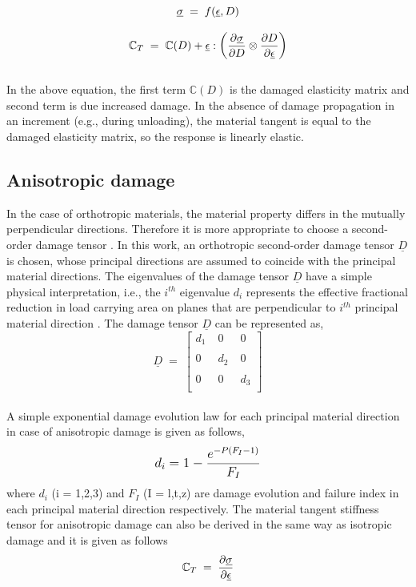 \documentclass[12pt,a4paper,twoside,openright]{report}
\begin{document}
\begin{equation*}
\large{\underline{\sigma}  \; = \; f(\underline{ \epsilon}, D) }
\end{equation*}

\begin{equation}
\large{\mathbb{C}_{T}  \; = \; \mathbb{C}(D) + \underline{ \epsilon}  : \Big(\frac{\partial \underline{\sigma} }{\partial D} \otimes \frac{\partial D}{\partial \underline{ \epsilon}} \Big)    }
\end{equation}
\\
In the above equation, the first term $\mathbb{C}(D)$ is the damaged elasticity matrix and second term is due increased damage. In the absence of damage propagation in an increment (e.g., during unloading), the material tangent is equal to the damaged elasticity matrix, so the response is linearly elastic.
\subsection{Anisotropic damage}
\indent\indent\indent In the case of orthotropic materials, the material property differs in the mutually perpendicular directions. Therefore it is more appropriate to choose a second-order damage tensor \citep{murakami2012continuum}. In this work, an orthotropic second-order damage tensor $\underline{D}$ is chosen, whose principal directions are assumed to coincide with the principal material directions. The eigenvalues of the damage tensor $\underline{D}$ have a simple physical interpretation, i.e., the $i^{th}$ eigenvalue $d_{i}$ represents the effective fractional reduction in load carrying area on planes that are perpendicular to $i^{th}$ principal material direction \citep{wang2009three}. The damage tensor $\underline{D}$ can be represented as,
\\
$$
\underline{D} \; = \; 
 \begin{bmatrix}
  d_{1}  \;& 0  \; & 0  \\
  \\
  0 \; & d_{2} \; & 0  \\
  \\  
  0 \; & 0 \; & d_{3} \\
  
 \end{bmatrix}
 $$  
\\
A simple exponential damage evolution law \citep{wang2009three} for each principal material direction in case of anisotropic damage is given as follows,
\begin{equation}
\mathlarger{d_{i} = 1 - \frac{e^{-P(F_{I} - 1)} }{F_{I}} } 
\label{exponential damage equation}
\end{equation}
where $d_{i}$ (i = 1,2,3) and $F_{I}$ (I = l,t,z) are damage evolution and failure index in each principal material direction respectively.
The material tangent stiffness tensor for anisotropic damage \citep{lapczyk2007progressive} can also be derived in the same way as isotropic damage and it is given as follows
\begin{equation*}
\large{ \mathbb{C}_{T}  \; = \;\frac{\partial \underline{\sigma} }{\partial \underline{ \epsilon} }  }
\end{equation*}
\end{document}
